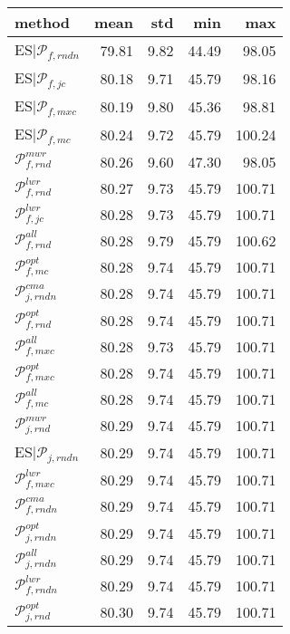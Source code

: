 \begin{tabular}{|@{}l@{}|@{}r@{}|@{}r@{}|@{}r@{}|@{}r@{}|}\hline
method & mean & std & min & max \\ \hline\hline
ES$|{\mathcal{P}_{f,rndn}}$ &  79.81 &  9.82 &  44.49 &  98.05  \\ 
ES\boldmath$|{\mathcal{P}_{f,jc}}$ &  80.18 &  9.71 &  45.79 &  98.16  \\ 
ES$|{\mathcal{P}_{f,mxc}}$ &  80.19 &  9.80 &  45.36 &  98.81  \\ 
ES$|{\mathcal{P}_{f,mc}}$ &  80.24 &  9.72 &  45.79 &  100.24  \\ 
${\mathcal{P}_{f,rnd}^{mwr}}$ &  80.26 &  9.60 &  47.30 &  98.05  \\ 
${\mathcal{P}_{f,rnd}^{lwr}}$ &  80.27 &  9.73 &  45.79 &  100.71  \\ 
\boldmath${\mathcal{P}_{f,jc}^{lwr}}$ &  80.28 &  9.73 &  45.79 &  100.71  \\ 
${\mathcal{P}_{f,rnd}^{all}}$ &  80.28 &  9.79 &  45.79 &  100.62  \\ 
${\mathcal{P}_{f,mc}^{opt}}$ &  80.28 &  9.74 &  45.79 &  100.71  \\ 
${\mathcal{P}_{j,rndn}^{cma}}$ &  80.28 &  9.74 &  45.79 &  100.71  \\ 
${\mathcal{P}_{f,rnd}^{opt}}$ &  80.28 &  9.74 &  45.79 &  100.71  \\ 
${\mathcal{P}_{f,mxc}^{all}}$ &  80.28 &  9.73 &  45.79 &  100.71  \\ 
${\mathcal{P}_{f,mxc}^{opt}}$ &  80.28 &  9.74 &  45.79 &  100.71  \\ 
${\mathcal{P}_{f,mc}^{all}}$ &  80.28 &  9.74 &  45.79 &  100.71  \\ 
${\mathcal{P}_{j,rnd}^{mwr}}$ &  80.29 &  9.74 &  45.79 &  100.71  \\ 
ES$|{\mathcal{P}_{j,rndn}}$ &  80.29 &  9.74 &  45.79 &  100.71  \\ 
${\mathcal{P}_{f,mxc}^{lwr}}$ &  80.29 &  9.74 &  45.79 &  100.71  \\ 
${\mathcal{P}_{f,rndn}^{cma}}$ &  80.29 &  9.74 &  45.79 &  100.71  \\ 
${\mathcal{P}_{j,rndn}^{opt}}$ &  80.29 &  9.74 &  45.79 &  100.71  \\ 
${\mathcal{P}_{j,rndn}^{all}}$ &  80.29 &  9.74 &  45.79 &  100.71  \\ 
${\mathcal{P}_{f,rndn}^{lwr}}$ &  80.29 &  9.74 &  45.79 &  100.71  \\ 
${\mathcal{P}_{j,rnd}^{opt}}$ &  80.30 &  9.74 &  45.79 &  100.71  \\ 

\end{tabular}
